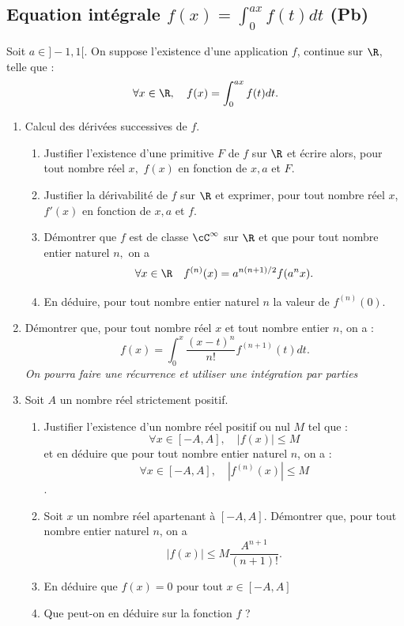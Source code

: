 \subsection{Equation intégrale $f(x) =\int_0^{ax} f(t)dt$ (Pb)}

\begin{exercice}
Soit $a\in ]-1,1[. $ On suppose l'existence d'une application $f$, continue sur $\R$, telle que :
$$\forall x\in \R, \quad f(x) =\int_0^{ax} f(t)dt.$$
\begin{enumerate}
\item Calcul des dérivées successives de $f$. 
\begin{enumerate}
\item Justifier l'existence d'une primitive $F$ de $f$ sur $\R$ et écrire alors, pour tout nombre réel $x,$
$f(x)$ en fonction de $x, a$ et $F$. 
\item Justifier la dérivabilité de $f$ sur $\R$ et exprimer, pour tout nombre réel $x$, $f'(x)$  en fonction de $x, a$ et $f$. 
\item Démontrer que $f$ est de classe $\cC^\infty $ sur $\R$ et que pour tout nombre entier naturel $n,$ on a 
$$\forall x\in \R \quad  f^{(n)} (x) =a^{n(n+1)/2} f(a^nx).$$
\item En déduire, pour tout nombre entier naturel $n$ la valeur de $f^{(n)} (0)$. 
\end{enumerate}
\item Démontrer que, pour tout nombre réel $x$ et tout nombre entier $n$, on a :
$$f(x) = \int_0^x \frac{(x-t)^n}{n!} f^{(n+1)} (t) dt.$$
\footnotesize{ \textit{On pourra faire une récurrence et utiliser une intégration par parties}}
\normalsize{}
\item Soit $A$ un nombre réel strictement positif. 
\begin{enumerate}
\item Justifier l'existence d'un nombre réel positif ou nul $M$ tel que : 
$$\forall x\in [-A,A], \quad |f(x) | \leq M$$
et en déduire que pour tout nombre entier naturel $n$, on a :
$$\forall x\in [-A,A], \quad |f^{(n)}(x) | \leq M$$.
\item Soit $x$ un nombre réel apartenant à $[-A,A].$ Démontrer que, pour tout nombre entier naturel $n$, on  a 
$$|f(x)| \leq M\frac{A^{n+1}}{(n+1)!}.$$
\item En déduire que $f(x) = 0$ pour tout $x\in [-A,A]$
\item Que peut-on en déduire sur la fonction $f$ ? 
\end{enumerate} 
\end{enumerate}
\end{exercice}



